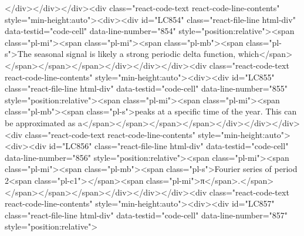 {{{{{{{{{</div></div></div><div class="react-code-text react-code-line-contents" style="min-height:auto"><div><div id="LC854" class="react-file-line html-div" data-testid="code-cell" data-line-number="854" style="position:relative"><span class="pl-mi"><span class="pl-mi"><span class="pl-mb"><span class="pl-s">The seasonal signal is likely a strong periodic delta function, which</span></span></span></span></div></div></div><div class="react-code-text react-code-line-contents" style="min-height:auto"><div><div id="LC855" class="react-file-line html-div" data-testid="code-cell" data-line-number="855" style="position:relative"><span class="pl-mi"><span class="pl-mi"><span class="pl-mb"><span class="pl-s">peaks at a specific time of the year. This can be approximated as a</span></span></span></span></div></div></div><div class="react-code-text react-code-line-contents" style="min-height:auto"><div><div id="LC856" class="react-file-line html-div" data-testid="code-cell" data-line-number="856" style="position:relative"><span class="pl-mi"><span class="pl-mi"><span class="pl-mb"><span class="pl-s">Fourier series of period 2<span class="pl-c1">\emph</span>{<span class="pl-mi">π</span>}.</span></span></span></span></div></div></div><div class="react-code-text react-code-line-contents" style="min-height:auto"><div><div id="LC857" class="react-file-line html-div" data-testid="code-cell" data-line-number="857" style="position:relative">
}}}}}}}}}
